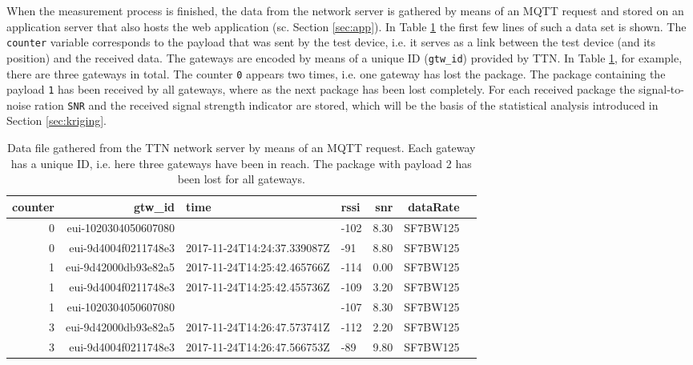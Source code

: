 When the measurement process is finished, the data from the network server is gathered by means of an MQTT request and stored on an application server that also hosts the web application (sc. Section \ref{sec:app}). In Table \ref{tab:ttn} the first few lines of such a data set is shown. The \texttt{counter} variable corresponds to the payload that was sent by the test device, i.e. it serves as a link between the test device (and its position) and the received data. The gateways are encoded by means of a unique ID (\texttt{gtw\_id}) provided by TTN. In Table \ref{tab:ttn}, for example, there are three gateways in total. The counter \texttt{0} appears two times, i.e. one gateway has lost the package. The package containing the payload \texttt{1} has been received by all gateways, where as the next package has been lost completely. For each received package the signal-to-noise ration \texttt{SNR} and the received signal strength indicator  are stored, which will be the basis of the statistical analysis introduced in Section \ref{sec:kriging}.


\begin{table}[h!]
\centering
\begin{tabular}{rrllrrl}
  \hline
  counter &   gtw\_id & time & rssi & snr & dataRate \\ 
  \hline
     0 &   eui-1020304050607080 &  & -102 & 8.30 & SF7BW125 \\ 
     0 &   eui-9d4004f0211748e3 & 2017-11-24T14:24:37.339087Z & -91 & 8.80 & SF7BW125 \\ 
     1 &   eui-9d42000db93e82a5 & 2017-11-24T14:25:42.465766Z & -114 & 0.00 & SF7BW125 \\ 
     1 &   eui-9d4004f0211748e3 & 2017-11-24T14:25:42.455736Z & -109 & 3.20 & SF7BW125 \\ 
     1 &   eui-1020304050607080 &  & -107 & 8.30 & SF7BW125 \\ 
     3 &   eui-9d42000db93e82a5 & 2017-11-24T14:26:47.573741Z & -112 & 2.20 & SF7BW125 \\ 
     3 &   eui-9d4004f0211748e3 & 2017-11-24T14:26:47.566753Z & -89 & 9.80 & SF7BW125 \\ 
   \hline
\end{tabular}
\caption{Data file gathered from the TTN network server by means of an MQTT request. Each gateway has a unique ID, i.e. here three gateways have been in reach. The package with payload 2 has been lost for all gateways.}\label{tab:ttn}
\end{table}

